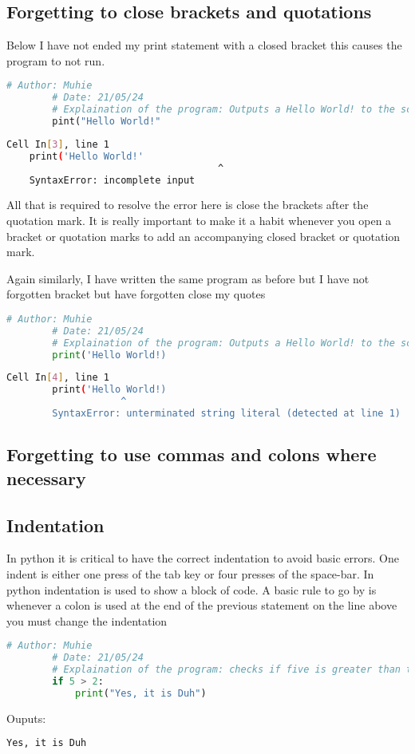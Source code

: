 \documentclass{article}
\begin{document}
	\subsection{Forgetting to close brackets and quotations}
	Below I have not ended my print statement with a closed bracket this causes the program to not run.
	\begin{lstlisting}[language=Python]
		# Author: Muhie
		# Date: 21/05/24
		# Explaination of the program: Outputs a Hello World! to the screen
		pint("Hello World!"
	\end{lstlisting}
	\begin{lstlisting}[language=Bash]
	  Cell In[3], line 1
	print('Hello World!'
					   				 ^
	SyntaxError: incomplete input
	\end{lstlisting}
	All that is required to resolve the error here is close the brackets after the quotation mark. It is really important to make it a habit whenever you open a bracket or quotation marks to add an accompanying closed bracket or quotation mark.
	
	Again similarly, I have written the same program as before but I have not forgotten bracket but have forgotten close my quotes
		\begin{lstlisting}[language=Python]
		# Author: Muhie
		# Date: 21/05/24
		# Explaination of the program: Outputs a Hello World! to the screen
		print('Hello World!)
	\end{lstlisting}
	\begin{lstlisting}[language=Bash]
		  Cell In[4], line 1
		print('Hello World!)
					^
		SyntaxError: unterminated string literal (detected at line 1)
	\end{lstlisting}
	\subsection{Forgetting to use commas and colons where necessary}
	\subsection{Indentation}
	In python it is critical to have the correct indentation to avoid basic errors. One indent is either one press of the tab key or four presses of the space-bar. In python indentation is used to show a block of code.
	A basic rule to go by is whenever a colon is used at the end of the previous statement on the line above you must change the indentation
	\begin{lstlisting}[language=Python]
		# Author: Muhie
		# Date: 21/05/24
		# Explaination of the program: checks if five is greater than two and prints Yes it is Duh
		if 5 > 2:
			print("Yes, it is Duh")
	\end{lstlisting}
	Ouputs:
	\begin{lstlisting}[language=Bash]
		Yes, it is Duh
	
	\end{lstlisting}
	
\end{document}
